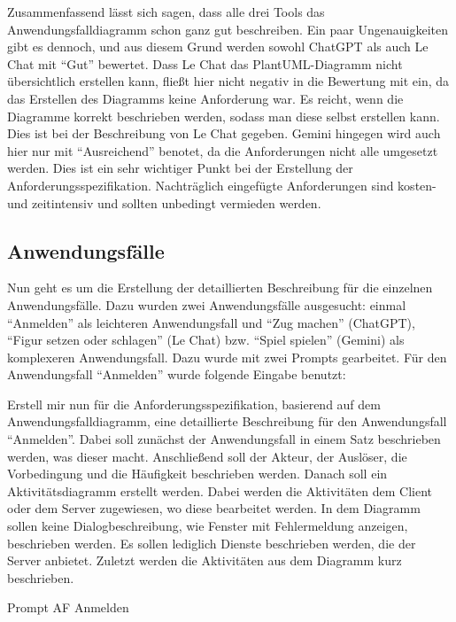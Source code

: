 Zusammenfassend lässt sich sagen, dass alle drei Tools das Anwendungsfalldiagramm schon ganz gut beschreiben. Ein paar Ungenauigkeiten gibt 
es dennoch, und aus diesem Grund werden sowohl ChatGPT als auch Le Chat mit ``Gut'' bewertet. Dass Le Chat das PlantUML-Diagramm nicht übersichtlich 
erstellen kann, fließt hier nicht negativ in die Bewertung mit ein, da das Erstellen des Diagramms keine Anforderung war. Es reicht, wenn die 
Diagramme korrekt beschrieben werden, sodass man diese selbst erstellen kann. Dies ist bei der Beschreibung von Le Chat gegeben. Gemini hingegen 
wird auch hier nur mit ``Ausreichend'' benotet, da die Anforderungen nicht alle umgesetzt werden. Dies ist ein sehr wichtiger Punkt bei der Erstellung 
der Anforderungsspezifikation. Nachträglich eingefügte Anforderungen sind kosten- und zeitintensiv und sollten unbedingt vermieden werden.

\subsection*{Anwendungsfälle}

Nun geht es um die Erstellung der detaillierten Beschreibung für die einzelnen Anwendungsfälle. Dazu wurden zwei Anwendungsfälle ausgesucht: 
einmal ``Anmelden'' als leichteren Anwendungsfall und ``Zug machen'' (ChatGPT), ``Figur setzen oder schlagen'' (Le Chat) bzw. ``Spiel spielen'' (Gemini) 
als komplexeren Anwendungsfall. Dazu wurde mit zwei Prompts gearbeitet. Für den Anwendungsfall ``Anmelden'' wurde folgende Eingabe benutzt:

\begin{prompt}[H]
    \begin{tcolorbox}[colback=gray!20, colframe=gray!20, boxrule=0pt, sharp corners] 
        Erstell mir nun für die Anforderungsspezifikation, basierend auf dem Anwendungsfalldiagramm, eine detaillierte Beschreibung für den Anwendungsfall ``Anmelden''. Dabei 
        soll zunächst der Anwendungsfall in einem Satz beschrieben werden, was dieser macht. Anschließend soll der Akteur, der Auslöser, die Vorbedingung und die Häufigkeit 
        beschrieben werden. Danach soll ein Aktivitätsdiagramm erstellt werden. Dabei werden die Aktivitäten dem Client oder dem Server zugewiesen, wo diese bearbeitet werden. 
        In dem Diagramm sollen keine Dialogbeschreibung, wie Fenster mit Fehlermeldung anzeigen, beschrieben werden. Es sollen lediglich Dienste beschrieben werden, die der 
        Server anbietet. Zuletzt werden die Aktivitäten aus dem Diagramm kurz beschrieben.
        \vfill
    \end{tcolorbox}
    \caption{Prompt AF Anmelden}
    \label{Prompt AF Anmelden}
\end{prompt}

